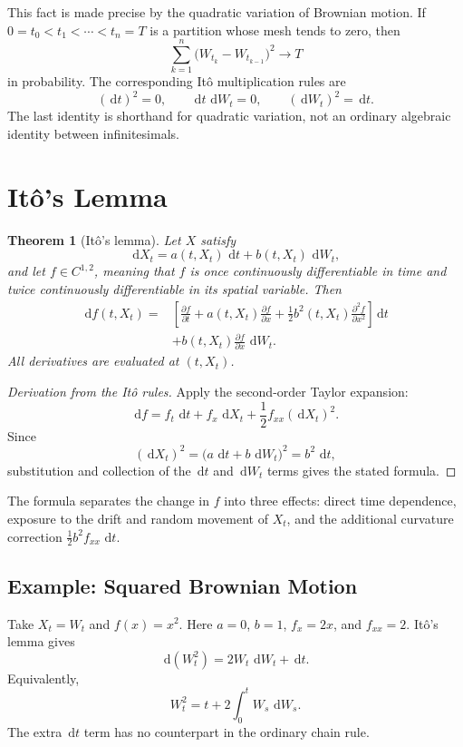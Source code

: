 \documentclass[12pt,openany]{book}
\newtheorem{theorem}{Theorem}[section]
\theoremstyle{definition}
\theoremstyle{remark}
\newcommand{\dd}{\,\mathrm{d}}
\begin{document}
This fact is made precise by the quadratic variation of Brownian motion.  If
\(0=t_0<t_1<\cdots<t_n=T\) is a partition whose mesh tends to zero, then
\[
\sum_{k=1}^{n}
  \bigl(W_{t_k}-W_{t_{k-1}}\bigr)^2
\longrightarrow T
\]
in probability.  The corresponding Itô multiplication rules are
\[
\boxed{
(\dd t)^2=0,
\qquad
\dd t\,\dd W_t=0,
\qquad
(\dd W_t)^2=\dd t.
}
\]
The last identity is shorthand for quadratic variation, not an ordinary
algebraic identity between infinitesimals.

\section{Itô's Lemma}

\begin{theorem}[Itô's lemma]
Let \(X\) satisfy
\[
\dd X_t=a(t,X_t)\,\dd t+b(t,X_t)\,\dd W_t,
\]
and let \(f\in C^{1,2}\), meaning that \(f\) is once continuously
differentiable in time and twice continuously differentiable in its spatial
variable.  Then
\[
\boxed{
\begin{aligned}
\dd f(t,X_t)
={}&\left[
\frac{\partial f}{\partial t}
+a(t,X_t)\frac{\partial f}{\partial x}
+\frac12 b^2(t,X_t)\frac{\partial^2 f}{\partial x^2}
\right]\dd t\\
&+b(t,X_t)\frac{\partial f}{\partial x}\,\dd W_t.
\end{aligned}}
\]
All derivatives are evaluated at \((t,X_t)\).
\end{theorem}

\begin{proof}[Derivation from the Itô rules]
Apply the second-order Taylor expansion:
\[
\dd f=f_t\,\dd t+f_x\,\dd X_t
+\frac12 f_{xx}(\dd X_t)^2.
\]
Since
\[
(\dd X_t)^2
=\bigl(a\,\dd t+b\,\dd W_t\bigr)^2
=b^2\,\dd t,
\]
substitution and collection of the \(\dd t\) and \(\dd W_t\) terms gives
the stated formula.
\end{proof}

The formula separates the change in \(f\) into three effects: direct time
dependence, exposure to the drift and random movement of \(X_t\), and the
additional curvature correction
\(\tfrac12 b^2 f_{xx}\,\dd t\).

\subsection{Example: Squared Brownian Motion}

Take \(X_t=W_t\) and \(f(x)=x^2\).  Here \(a=0\), \(b=1\),
\(f_x=2x\), and \(f_{xx}=2\).  Itô's lemma gives
\[
\boxed{
\dd(W_t^2)=2W_t\,\dd W_t+\dd t.
}
\]
Equivalently,
\[
W_t^2=t+2\int_0^t W_s\,\dd W_s.
\]
The extra \(\dd t\) term has no counterpart in the ordinary chain rule.
\end{document}
